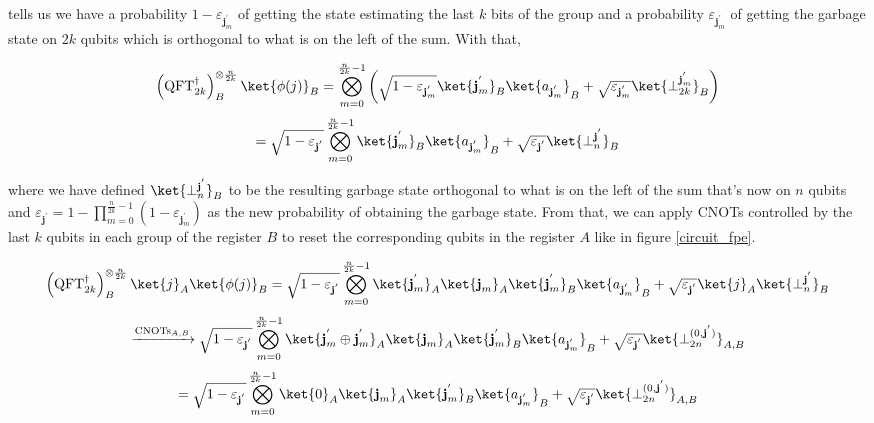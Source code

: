 tells us we have a probability $1- \varepsilon_{\textbf{j}^{'}_m}$ of getting the state estimating the last $k$ bits of the group and a probability $ \varepsilon_{\textbf{j}^{'}_m}$ of getting the garbage state on $2k$ qubits which is orthogonal to what is on the left of the sum. With that,

\begin{equation*}
    \left(\text{QFT}^{\dagger}_{2k}\right)^{\otimes \frac{n}{2k}}_B\ket{\phi(j)}_B = \bigotimes_{m=0}^{\frac{n}{2k}-1}\left(\sqrt{1 - \varepsilon_{\textbf{j}^{'}_m}}\ket{\textbf{j}^{'}_m}_B\ket{a_{\textbf{j}^{'}_m}}_B + \sqrt{\varepsilon_{\textbf{j}^{'}_m}}\ket{\perp_{2k}^{\textbf{j}^{'}_m}}_B\right) 
\end{equation*}
\begin{equation}
    = \sqrt{1-\varepsilon_{\textbf{j}^{'}}} \bigotimes_{m=0}^{\frac{n}{2k}-1}\ket{\textbf{j}^{'}_m}_B\ket{a_{\textbf{j}^{'}_m}}_B + \sqrt{\varepsilon_{\textbf{j}^{'}}}\ket{\perp_{n}^{\textbf{j}^{'}}}_B
    \label{state_fpe_after_first_layer_of_qft_dagger}
\end{equation}

where we have defined $\ket{\perp_{n}^{\textbf{j}^{'}}}_B$ to be the resulting garbage state orthogonal to what is on the left of the sum that's now on $n$ qubits and $\varepsilon_{\textbf{j}^{'}} = 1 - \prod_{m=0}^{\frac{n}{2k}-1}\left(1-\varepsilon_{\textbf{j}^{'}_m}\right)$ as the new probability of obtaining the garbage state. From that, we can apply CNOTs controlled by the last $k$ qubits in each group of the register $B$ to reset the corresponding qubits in the register $A$ like in figure \ref{circuit_fpe}.

\begin{equation*}
    \left(\text{QFT}^{\dagger}_{2k}\right)^{\otimes \frac{n}{2k}}_B\ket{j}_A\ket{\phi(j)}_B = \sqrt{1 - \varepsilon_{\textbf{j}^{'}}}\bigotimes_{m=0}^{\frac{n}{2k}-1}\ket{\textbf{j}_m^{'}}_A\ket{\textbf{j}_m}_A\ket{\textbf{j}_m^{'}}_B\ket{a_{\textbf{j}_m^{'}}}_B + \sqrt{\varepsilon_{\textbf{j}^{'}}}\ket{j}_A\ket{\perp_{n}^{\textbf{j}^{'}}}_B
\end{equation*}
\begin{equation*}
    \xrightarrow{\text{CNOTs}_{A,B}} \sqrt{1 - \varepsilon_{\textbf{j}^{'}}}\bigotimes_{m=0}^{\frac{n}{2k}-1}\ket{\textbf{j}_m^{'} \oplus \textbf{j}_m^{'}}_A\ket{\textbf{j}_m}_A\ket{\textbf{j}_m^{'}}_B\ket{a_{\textbf{j}_m^{'}}}_B + \sqrt{\varepsilon_{\textbf{j}^{'}}}\ket{\perp_{2n}^{(0,\textbf{j}^{'})}}_{A,B}
\end{equation*}
\begin{equation*}
    = \sqrt{1 - \varepsilon_{\textbf{j}^{'}}}\bigotimes_{m=0}^{\frac{n}{2k}-1}\ket{0}_A\ket{\textbf{j}_m}_A\ket{\textbf{j}_m^{'}}_B\ket{a_{\textbf{j}_m^{'}}}_B + \sqrt{\varepsilon_{\textbf{j}^{'}}}\ket{\perp_{2n}^{(0,\textbf{j}^{'})}}_{A,B}
\end{equation*}

